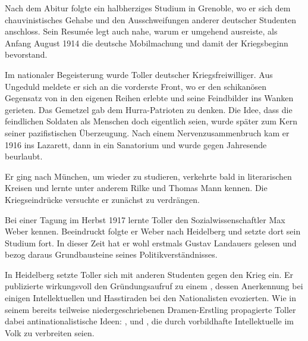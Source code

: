 Nach dem Abitur folgte ein halbherziges Studium in Grenoble, wo er sich dem
chauvinistisches Gehabe und den \Cite{abenteuerlichen} Ausschweifungen anderer
deutscher Studenten anschloss. Sein Resumée \Cite{Ich lebe in Frankreich und
habe Deutschland nie verlassen} 
legt auch nahe, warum er umgehend ausreiste,
als Anfang August 1914 die deutsche Mobilmachung und damit der Kriegsbeginn
bevorstand.


Im \Cite{Rausch des Gefühls} 
nationaler Begeisterung wurde Toller deutscher
Kriegsfreiwilliger. Aus Ungeduld meldete er sich an die vorderste Front, wo er
den schikanösen Gegensatz von \Cite{Oben und Unten} in den eigenen Reihen
erlebte und seine Feindbilder ins Wanken gerieten.  Das Gemetzel gab dem
Hurra-Patrioten zu denken. Die Idee, dass die feindlichen Soldaten als
Menschen doch eigentlich \Cite{Brüder}
seien, wurde später zum Kern seiner
pazifistischen Überzeugung. Nach einem Nervenzusammenbruch kam er 1916 ins
Lazarett, dann in ein Sanatorium und wurde gegen Jahresende beurlaubt.

Er ging nach München, um wieder zu studieren, verkehrte bald in literarischen
Kreisen und lernte unter anderem Rilke und Thomas Mann kennen. Die
Kriegseindrücke versuchte er zunächst zu verdrängen.

Bei einer Tagung im Herbst 1917 lernte Toller den Sozialwissenschaftler Max
Weber kennen. Beeindruckt folgte er Weber nach Heidelberg und setzte dort sein
Studium fort. In dieser Zeit hat er wohl erstmals Gustav Landauers
\Cite{Aufruf zum Sozialismus} gelesen und bezog daraus Grundbausteine seines
Politikverständnisses.

In Heidelberg setzte Toller sich mit anderen Studenten gegen den Krieg ein. Er
publizierte wirkungsvoll den Gründungsaufruf zu einem \Cite{Kulturpolitischen
Bund der Jugend in Deutschland}, dessen \Cite{Leitlinien} Anerkennung bei
einigen Intellektuellen und Hasstiraden bei den Nationalisten evozierten. Wie
in seinem bereits teilweise niedergeschriebenen Dramen-Erstling \Cite{Die
Wandlung} propagierte Toller dabei antinationalistische Ideen: \Cite{Liebe zu
den Menschen}, \Cite{Besinnung auf Menschhaftigkeit} und \Cite{Wahrhaftigkeit
des Geistes}, die durch vorbildhafte Intellektuelle im Volk zu verbreiten
seien.

